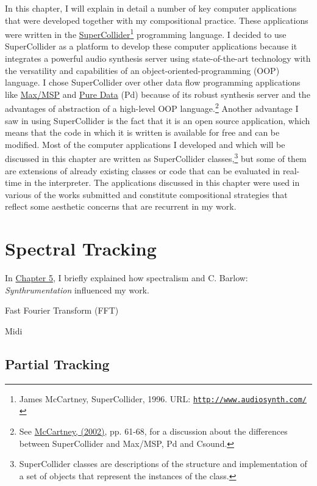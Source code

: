 In this chapter, I will explain in detail a number of key computer applications that were developed together with my compositional practice. These applications were written in the \href{http://supercollider.sourceforge.net/}{\mbox{SuperCollider}}\footnote{James McCartney, SuperCollider, 1996. URL: \href{http://www.audiosynth.com/}{\texttt{http://www.audiosynth.com/}}} programming language. I decided to use SuperCollider as a platform to develop these computer applications because it integrates a powerful audio synthesis server using state-of-the-art technology with the versatility and capabilities of an object-oriented-programming (OOP) language. I chose SuperCollider over other data flow programming applications like \href{http://www.cycling74.com/}{Max/MSP} and \href{http://puredata.info/}{Pure Data} (Pd) because of its robust synthesis server and the advantages of abstraction of a high-level OOP language.\footnote{See \hyperlink{mccartney}{McCartney, (2002)}, pp. 61-68, for a discussion about the differences between SuperCollider and Max/MSP, Pd and Csound.} Another advantage I saw in using SuperCollider is the fact that it is an open source application, which means that the code in which it is written is available for free and can be modified. Most of the computer applications I developed and which will be discussed in this chapter are written as SuperCollider classes,\footnote{SuperCollider classes are descriptions of the structure and implementation of a set of objects that represent the instances of the class.} but some of them are extensions of already existing classes or code that can be evaluated in real-time in the interpreter. The applications discussed in this chapter were used in various of the works submitted and constitute compositional strategies that reflect some aesthetic concerns that are recurrent in my work.

\section{Spectral Tracking}

In \hyperlink{chapter5}{Chapter 5}, I briefly explained how spectralism and C. Barlow: \emph{Synthrumentation} influenced my work.

Fast Fourier Transform (FFT)


Midi

\subsection{Partial Tracking}


